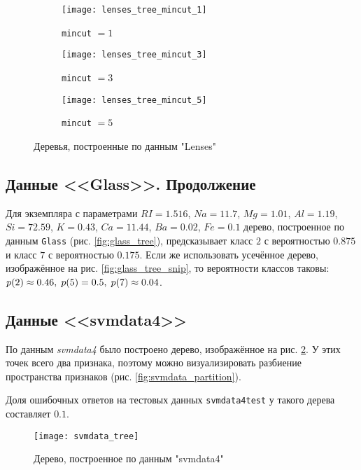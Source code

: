 \documentclass[a4paper,12pt]{article} %
\newcommand{\myPictWidth}{.95\textwidth}
\begin{document}
\begin{figure}[H]
    \centering
    \begin{subfigure}{.9\textwidth}
        \centering
        \texttt{[image: lenses\_tree\_mincut\_1]}
        \caption{ \texttt{mincut} $ =1 $ }
    \end{subfigure}

    \begin{subfigure}{.5\textwidth}
        \centering
        \texttt{[image: lenses\_tree\_mincut\_3]}
        \caption{ \texttt{mincut} $ =3 $ }
    \end{subfigure}%
    \begin{subfigure}{.5\textwidth}
        \centering
        \texttt{[image: lenses\_tree\_mincut\_5]}
        \caption{ \texttt{mincut} $ =5 $ }
    \end{subfigure}
    \caption{ Деревья, построенные по данным "Lenses" }
    \label{fig:lenses_trees}
\end{figure}

\subsection{Данные <<Glass>>. Продолжение}

Для экземпляра с параметрами $RI=1.516$, $Na=11.7$, $Mg=1.01$, $Al=1.19$, $Si=72.59$, $K=0.43$, $Ca=11.44$, $Ba=0.02$, $Fe=0.1$ дерево, построенное по данным \texttt{Glass} (рис. \ref{fig:glass_tree}), предсказывает класс $ 2 $  с вероятностью $ 0.875 $ и класс $ 7 $ с вероятностью $ 0.175 $.
Если же использовать усечённое дерево, изображённое на рис. \ref{fig:glass_tree_snip}, то вероятности классов таковы: $ p(2) \approx 0.46, \thickspace p(5) = 0.5, \thickspace p(7) \approx 0.04 $.

\subsection{Данные <<svmdata4>>}

По данным \textit{svmdata4} было построено дерево, изображённое на рис. \ref{fig:svmdata_tree}. У этих точек всего два признака, поэтому можно визуализировать разбиение пространства признаков (рис. \ref{fig:svmdata_partition}).

Доля ошибочных ответов на тестовых данных \texttt{svmdata4test} у такого дерева составляет $ 0.1 $.

\begin{figure}[H]
    \centering \texttt{[image: svmdata\_tree]}
    \caption{ Дерево, построенное по данным "svmdata4" }
    \label{fig:svmdata_tree}
\end{figure}
\end{document}
